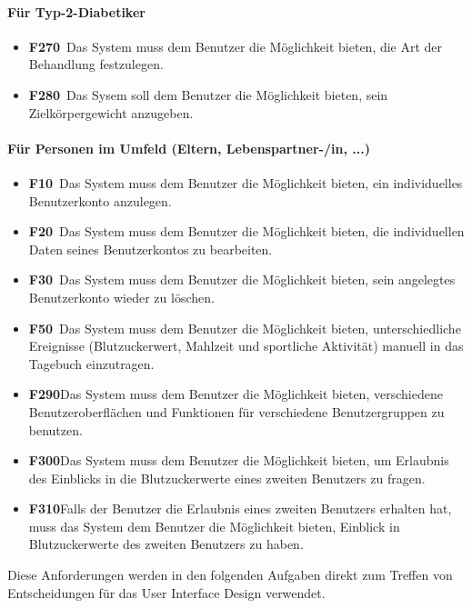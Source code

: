 \documentclass[a4paper,11pt]{article}%
\renewcommand{\\}{\vspace*{0.5\baselineskip} \newline}
\begin{document}
		\paragraph{Für Typ-2-Diabetiker}\mbox{}
	\begin{itemize}
		\item \lbrack \textbf{F270}\rbrack \ Das System muss dem Benutzer die Möglichkeit bieten, die Art der Behandlung festzulegen.
		\item \lbrack \textbf{F280}\rbrack \ Das Sysem soll dem Benutzer die Möglichkeit bieten, sein Zielkörpergewicht anzugeben.
	\end{itemize}
		\paragraph{Für Personen im Umfeld (Eltern, Lebenspartner-/in, ...)}\mbox{}
			\begin{itemize}
				\item \lbrack \textbf{F10}\rbrack \ Das System muss dem Benutzer die Möglichkeit bieten, ein individuelles Benutzerkonto anzulegen.
				\item \lbrack \textbf{F20}\rbrack \  Das System muss dem Benutzer die Möglichkeit bieten, die individuellen Daten seines Benutzerkontos zu bearbeiten.
				\item \lbrack \textbf{F30}\rbrack \  Das System muss dem Benutzer die Möglichkeit bieten, sein angelegtes Benutzerkonto wieder zu löschen.
				\item \lbrack \textbf{F50}\rbrack \	Das System muss dem Benutzer die Möglichkeit bieten, unterschiedliche Ereignisse (Blutzuckerwert, Mahlzeit und sportliche Aktivität) manuell in das Tagebuch einzutragen.
				\item \lbrack \textbf{F290}\rbrack Das System muss dem Benutzer die Möglichkeit bieten, verschiedene Benutzeroberflächen und Funktionen für verschiedene Benutzergruppen zu benutzen.
				\item \lbrack \textbf{F300}\rbrack Das System muss dem Benutzer die Möglichkeit bieten, um Erlaubnis des Einblicks in die Blutzuckerwerte eines zweiten Benutzers zu fragen.
				\item \lbrack \textbf{F310}\rbrack Falls der Benutzer die Erlaubnis eines zweiten Benutzers erhalten hat, muss das System dem Benutzer die Möglichkeit bieten, Einblick in Blutzuckerwerte des zweiten Benutzers zu haben.
			\end{itemize}
		Diese Anforderungen werden in den folgenden Aufgaben direkt zum Treffen von Entscheidungen für das User Interface Design verwendet.
\end{document}
